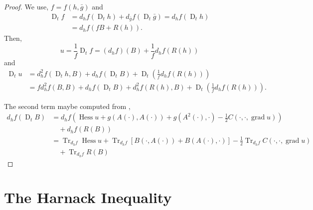 \documentclass{amsart}
\theoremstyle{definition}
\theoremstyle{remark}
\DeclareMathOperator{\grad}{grad}
\DeclareMathOperator{\Tr}{Tr}
\DeclareMathOperator{\hess}{Hess}
\DeclareMathOperator{\D}{D}
\numberwithin{equation}{section}
\begin{document}
\begin{proof}
We use, $f = f(h, \bar{g})$ and
\[
\begin{split}
\D_t f &= d_h f (\D_t h) + d_{\bar{g}} f(\D_t \bar{g}) = d_h f (\D_t h) \\
&= d_h f (fB + R(h)).
\end{split}
\]
Then,
\[
u = \frac{1}{f} \D_t f = (d_h f) (B) + \frac{1}{f} d_h f(R(h))
\]
and
\[
\begin{split}
\D_t u &= d^2_h f (\D_t h, B) + d_h f(\D_t B) + \D_t \left(\frac{1}{f} d_h f(R(h))\right) \\
&= f d^2_h f(B, B) + d_h f(\D_t B) + d^2_h f (R(h), B) + \D_t \left(\frac{1}{f} d_h f(R(h))\right).
\end{split}
\]

The second term maybe computed from ,
\[
\begin{split}
d_h f(\D_t B) &= d_h f \left(\hess u + g(A(\cdot), A(\cdot)) + g(A^2(\cdot), \cdot) - \frac{1}{2} C(\cdot, \cdot, \grad u)\right) \\
&\quad + d_h f (R(B)) \\
&= \Tr_{d_h f} \hess u + \Tr_{d_h f} \left[B(\cdot, A(\cdot)) + B(A(\cdot), \cdot)\right] -\frac{1}{2} \Tr_{d_h f} C(\cdot, \cdot, \grad u) \\
&\quad + \Tr_{d_h f} R(B)
\end{split}
\]

\end{proof}

\section{The Harnack Inequality}
\end{document}
